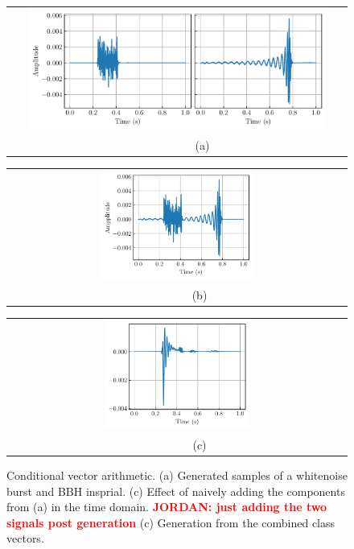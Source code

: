 \documentclass[12pt]{iopart}
\newcommand{\jordan}[1]{\textbf{\textcolor{red}{JORDAN: #1}}}
\begin{document}
\begin{figure}
  \centering
  \begin{tabular}[b]{c}
    \includegraphics[width=0.9\textwidth]{figures/wn+bbh.pdf} \\
    \small ~~~~~~~~~(a)
  \end{tabular} %
  
  \begin{tabular}[b]{c}
    \includegraphics[width=0.46\textwidth]{figures/ambient_result.pdf} \\
    \small ~~~~~~~~(b)
  \end{tabular}
 \begin{tabular}[b]{c}
    \includegraphics[width=0.44\textwidth]{figures/arithmetic_result.pdf} \\
    \small ~~~~~~~~(c)
  \end{tabular}
  \caption{Conditional vector arithmetic. (a) Generated samples of a whitenoise burst and BBH insprial. (c) Effect of naively adding the components from (a) in the time domain. \jordan{just adding the two signals post generation} (c) Generation from the combined class vectors. }
  \label{fig:arithmetic}
\end{figure}
\end{document}
